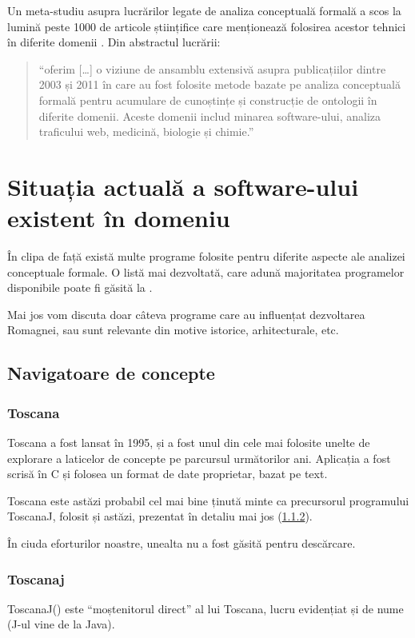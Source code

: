 \documentclass[12pt, a4paper, twoside, romanian]{teza-upb}
\begin{document}
    Un meta-studiu asupra lucrărilor legate de analiza conceptuală formală a scos la lumină peste 1000 de articole științifice care menționează folosirea acestor tehnici în diferite domenii \cite{Poelmans20136538}.
    Din abstractul lucrării:
    \begin{quote}
      ``oferim [\ldots] o viziune de ansamblu  extensivă asupra publicațiilor dintre 2003 și 2011 în care au fost folosite metode bazate pe analiza conceptuală formală pentru acumulare de cunoștințe și construcție de ontologii în diferite domenii. Aceste domenii includ minarea software-ului, analiza traficului web, medicină, biologie și chimie.''
    \end{quote}

    


\chapter{Situația actuală a software-ului existent în domeniu}
\label{chapter:2}

  În clipa de față există multe programe folosite pentru diferite aspecte ale analizei conceptuale formale. O listă mai dezvoltată, care adună majoritatea programelor disponibile poate fi găsită la \cite{utapriss:software}.

  Mai jos vom discuta doar câteva programe care au influențat dezvoltarea Romagnei, sau sunt relevante din motive istorice, arhitecturale, etc.
  \section{Navigatoare de concepte}
    \subsection{Toscana}
      Toscana\cite{Vogt:1995:Toscana} a fost lansat în 1995, și a fost unul din cele mai folosite unelte de explorare a laticelor de concepte pe parcursul următorilor ani. Aplicația a fost scrisă în C și folosea un format de date proprietar, bazat pe text.

      Toscana este astăzi probabil cel mai bine ținută minte ca precursorul programului ToscanaJ, folosit și astăzi, prezentat în detaliu mai jos (\ref{subsec:toscanaj}).

      În ciuda eforturilor noastre, unealta nu a fost găsită pentru descărcare.

    \subsection{Toscanaj}
    \label{subsec:toscanaj}
      ToscanaJ(\cite{Toscanaj:homepage}) este ``moștenitorul direct'' al lui Toscana, lucru evidențiat și de nume (J-ul vine de la Java).
\end{document}
